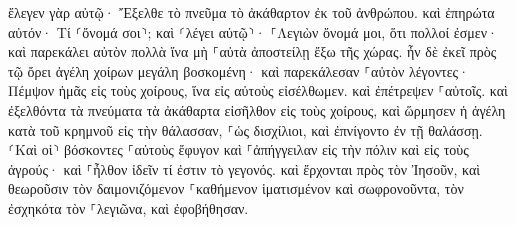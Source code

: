 \documentclass{openreader}
\begin{document}
ἔλεγεν γὰρ αὐτῷ· Ἔξελθε τὸ πνεῦμα τὸ ἀκάθαρτον ἐκ τοῦ ἀνθρώπου. 
καὶ ἐπηρώτα αὐτόν· Τί ⸂ὄνομά σοι⸃; καὶ ⸂λέγει αὐτῷ⸃· ⸀Λεγιὼν ὄνομά μοι, ὅτι πολλοί ἐσμεν· 
καὶ παρεκάλει αὐτὸν πολλὰ ἵνα μὴ ⸀αὐτὰ ἀποστείλῃ ἔξω τῆς χώρας. 
ἦν δὲ ἐκεῖ πρὸς τῷ ὄρει ἀγέλη χοίρων μεγάλη βοσκομένη· 
καὶ παρεκάλεσαν ⸀αὐτὸν λέγοντες· Πέμψον ἡμᾶς εἰς τοὺς χοίρους, ἵνα εἰς αὐτοὺς εἰσέλθωμεν. 
καὶ ἐπέτρεψεν ⸀αὐτοῖς. καὶ ἐξελθόντα τὰ πνεύματα τὰ ἀκάθαρτα εἰσῆλθον εἰς τοὺς χοίρους, καὶ ὥρμησεν ἡ ἀγέλη κατὰ τοῦ κρημνοῦ εἰς τὴν θάλασσαν, ⸀ὡς δισχίλιοι, καὶ ἐπνίγοντο ἐν τῇ θαλάσσῃ. 
⸂Καὶ οἱ⸃ βόσκοντες ⸀αὐτοὺς ἔφυγον καὶ ⸀ἀπήγγειλαν εἰς τὴν πόλιν καὶ εἰς τοὺς ἀγρούς· καὶ ⸀ἦλθον ἰδεῖν τί ἐστιν τὸ γεγονός. 
καὶ ἔρχονται πρὸς τὸν Ἰησοῦν, καὶ θεωροῦσιν τὸν δαιμονιζόμενον ⸀καθήμενον ἱματισμένον καὶ σωφρονοῦντα, τὸν ἐσχηκότα τὸν ⸀λεγιῶνα, καὶ ἐφοβήθησαν. 
\end{document}
